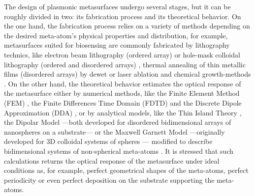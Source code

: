 The design of plasmonic metasurfaces undergo several stages, but it can be roughly divided in two: its fabrication process and its theoretical behavior. On the one hand, the fabrication process relies on a variety of methods depending on the desired meta-atom's physical properties and distribution, for example, metasurfaces suited for biosensing are commonly  fabricated by lithography technics, like electron beam lithography (ordered array) or hole-mask colloidal lithography  (ordered and disordered arrays) \cite{estevez_trends_2014}, thermal annealing of thin metallic films (disordered arrays) by dewet \cite{qiu_dual_2020} or laser ablation \cite{meng_anisotropic_2015} and chemical growth-methods \cite{estevez_trends_2014,kabashin_plasmonic_2009}. On the other hand, the theoretical behavior estimates the optical response of the metasurface either by numerical methods, like the Finite Element Method (FEM) \cite{feuz_improving_2010}, the Finite Differences Time Domain (FDTD) \cite{qiu_differential_2015} and the Discrete Dipole Approximation (DDA) \cite{meng_anisotropic_2015}, or by analytical models, like the Thin Island Theory \cite{svedendahl_refractometric_2014,bedeaux_optical_2004}, the Dipolar Model \cite{barrera1991optical} ---both developed for disordered bidimensional arrays of nanospheres on a substrate--- or the Maxwell Garnett Model ---originally developed for 3D colloidal systems of spheres \cite{sihvola_electromagnetic_2008}--- modified to describe bidimensional systems of non-spherical meta-atoms \cite{oates_characterization_2011,kabashin_plasmonic_2009,moirangthem_enhanced_2012}. It is stressed that such calculations returns the optical response of the metasurface under ideal conditions as, for example, perfect geometrical shapes of the meta-atoms, perfect periodicity or even perfect deposition on the substrate supporting the meta-atoms.

